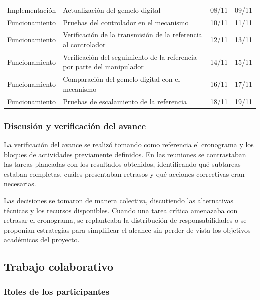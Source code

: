 \documentclass[11pt,a4paper]{article}
\begin{document}
\begin{table}[htbp]
\begin{tabular}{p{3.5cm}p{7cm}p{2cm}p{2cm}}
        Implementación & Actualización del gemelo digital & 08/11 & 09/11 \\
        Funcionamiento & Pruebas del controlador en el mecanismo & 10/11 & 11/11 \\
        Funcionamiento & Verificación de la transmisión de la referencia al controlador & 12/11 & 13/11 \\
        Funcionamiento & Verificación del seguimiento de la referencia por parte del manipulador & 14/11 & 15/11 \\
        Funcionamiento & Comparación del gemelo digital con el mecanismo & 16/11 & 17/11 \\
        Funcionamiento & Pruebas de escalamiento de la referencia & 18/11 & 19/11 \\
        \hline
    \end{tabular}
\end{table}



\subsubsection*{Discusión y verificación del avance}

La verificación del avance se realizó tomando como referencia el cronograma y los bloques de
actividades previamente definidos. En las reuniones se contrastaban las tareas planeadas con los
resultados obtenidos, identificando qué subtareas estaban completas, cuáles presentaban retrasos y
qué acciones correctivas eran necesarias.

Las decisiones se tomaron de manera colectiva, discutiendo las alternativas técnicas y los recursos
disponibles. Cuando una tarea crítica amenazaba con retrasar el cronograma, se replanteaba la
distribución de responsabilidades o se proponían estrategias para simplificar el alcance sin perder
de vista los objetivos académicos del proyecto.



\subsection{Trabajo colaborativo }
\label{subsec:trabajo_colaborativo}

\subsubsection*{Roles de los participantes}
\end{document}
